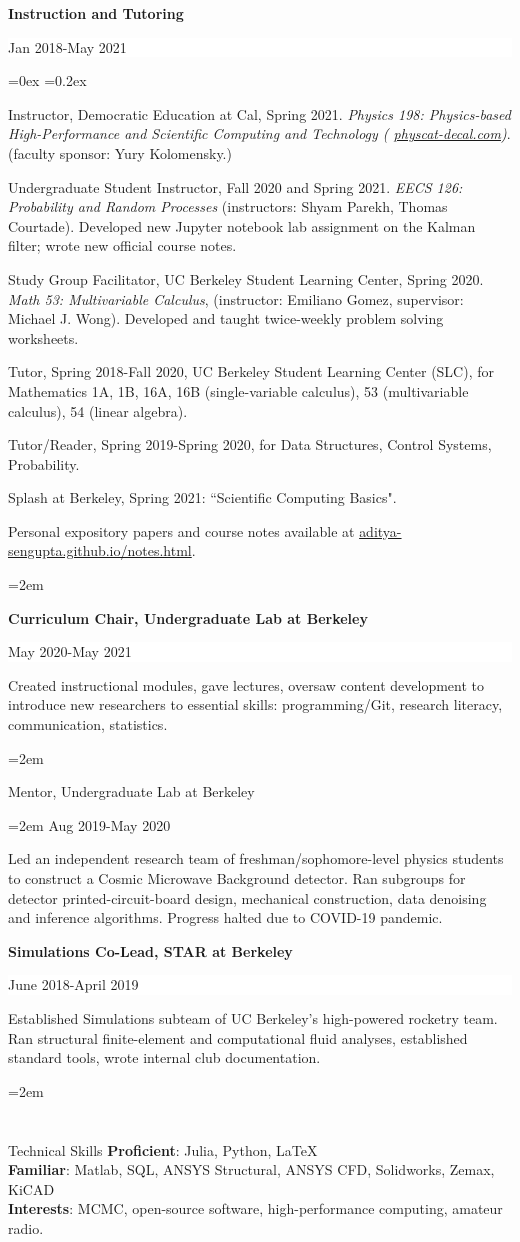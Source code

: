 \documentclass[paper=a4,fontsize=12pt]{scrartcl}
\newcommand{\cvlist}{%

    \rightmargin=0in
    \leftmargin=0.15in
    \topsep=0ex
    \partopsep=0pt
    \itemsep=0.2ex 
    \parsep=0pt
    \itemindent=0.0\leftmargin
    \listparindent=3.0\leftmargin
    \settowidth{\labelsep}{~}
    \leftskip=-10.1in
    \parindent=-0.1in
}
\newcommand{\NewPart}[1]{\section*{{#1}}}
\newcommand{\EducationEntry}[4]{
		\noindent \textbf{#1} \hfill      %
		\colorbox{White}{%
			\parbox{5cm}{%
			\hfill\color{Black}#2}} \par  %
		\noindent #3 \par        %
		\noindent\hangindent=2em\hangafter=0 \small #4 %
		\normalsize \par}
\begin{document}
\EducationEntry{Instruction and Tutoring}{Jan 2018-May 2021}{\vspace{-0.5cm}
    \begin{list}{\textbullet}{\cvlist}
        \setlength{\itemsep}{0pt}
        \item Instructor, Democratic Education at Cal, Spring 2021. \textit{Physics 198: Physics-based High-Performance and Scientific Computing and Technology (\color{blue} \href{physcat-decal.com}{physcat-decal.com})}. (faculty sponsor: Yury Kolomensky.)
        \item Undergraduate Student Instructor, Fall 2020 and Spring 2021. \textit{EECS 126: Probability and Random Processes} (instructors: Shyam Parekh, Thomas Courtade). Developed new Jupyter notebook lab assignment on the Kalman filter; wrote new official course notes.
        \item Study Group Facilitator, UC Berkeley Student Learning Center, Spring 2020. \textit{Math 53: Multivariable Calculus}, (instructor: Emiliano Gomez, supervisor: Michael J. Wong). Developed and taught twice-weekly problem solving worksheets.
        \item Tutor, Spring 2018-Fall 2020, UC Berkeley Student Learning Center (SLC), for Mathematics 1A, 1B, 16A, 16B (single-variable calculus), 53 (multivariable calculus), 54 (linear algebra).
        \item Tutor/Reader, Spring 2019-Spring 2020, for Data Structures, Control Systems, Probability.
        \item Splash at Berkeley, Spring 2021: ``Scientific Computing Basics".
        \item Personal expository papers and course notes available at {\color{blue} \href{aditya-sengupta.github.io/notes.html}{aditya-sengupta.github.io/notes.html}}.
    \end{list}
}\hfill

\EducationEntry{Curriculum Chair, Undergraduate Lab at Berkeley}{May 2020-May 2021}{Created instructional modules, gave lectures, oversaw content development to introduce new researchers to essential skills: programming/Git, research literacy, communication, statistics.
}

\EducationEntry{Mentor, Undergraduate Lab at Berkeley}{Aug 2019-May 2020}{Led an independent research team of freshman/sophomore-level physics students to construct a Cosmic Microwave Background detector. Ran subgroups for detector printed-circuit-board design, mechanical construction, data denoising and inference algorithms. Progress halted due to COVID-19 pandemic.}

\EducationEntry{Simulations Co-Lead, STAR at Berkeley}{June 2018-April 2019}{Established Simulations subteam of UC Berkeley's high-powered rocketry team. Ran structural finite-element and computational fluid analyses, established standard tools, wrote internal club documentation.
}

\NewPart{Technical Skills}
\textbf{Proficient}: Julia, Python, \LaTeX\\
\textbf{Familiar}: Matlab, SQL, ANSYS Structural, ANSYS CFD, Solidworks, Zemax, KiCAD\\
\textbf{Interests}: MCMC, open-source software, high-performance computing, amateur radio.
\end{document}
